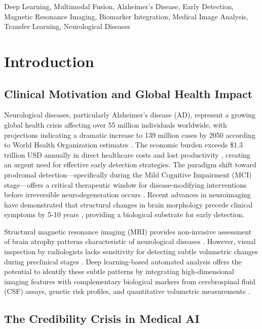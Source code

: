 \documentclass[conference]{IEEEtran}
\begin{document}
\begin{IEEEkeywords}
Deep Learning, Multimodal Fusion, Alzheimer's Disease, Early Detection, Magnetic Resonance Imaging, Biomarker Integration, Medical Image Analysis, Transfer Learning, Neurological Diseases
\end{IEEEkeywords}

\section{Introduction}

\subsection{Clinical Motivation and Global Health Impact}

Neurological diseases, particularly Alzheimer's disease (AD), represent a growing global health crisis affecting over 55 million individuals worldwide, with projections indicating a dramatic increase to 139 million cases by 2050 according to World Health Organization estimates \cite{WHO2023}. The economic burden exceeds \$1.3 trillion USD annually in direct healthcare costs and lost productivity \cite{ADI2019}, creating an urgent need for effective early detection strategies. The paradigm shift toward prodromal detection—specifically during the Mild Cognitive Impairment (MCI) stage—offers a critical therapeutic window for disease-modifying interventions before irreversible neurodegeneration occurs \cite{Jack2018}. Recent advances in neuroimaging have demonstrated that structural changes in brain morphology precede clinical symptoms by 5-10 years \cite{Bateman2012}, providing a biological substrate for early detection.

Structural magnetic resonance imaging (MRI) provides non-invasive assessment of brain atrophy patterns characteristic of neurological diseases \cite{Frisoni2010}. However, visual inspection by radiologists lacks sensitivity for detecting subtle volumetric changes during preclinical stages \cite{Dubois2014}. Deep learning-based automated analysis offers the potential to identify these subtle patterns by integrating high-dimensional imaging features with complementary biological markers from cerebrospinal fluid (CSF) assays, genetic risk profiles, and quantitative volumetric measurements \cite{Wen2020, Tanveer2020}.

\subsection{The Credibility Crisis in Medical AI}
\end{document}
